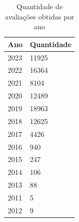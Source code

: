 \begin{table}[]
	\centering
	\begin{tabular}{|l|l|}
		\hline
		\textbf{Ano} & \textbf{Quantidade} \\\hline
		2023         & 11925               \\
		2022         & 16364               \\
		2021         & 8104                \\
		2020         & 12489               \\
		2019         & 18963               \\
		2018         & 12625               \\
		2017         & 4426                \\
		2016         & 940                 \\
		2015         & 247                 \\
		2014         & 106                 \\
		2013         & 88                  \\
		2011         & 5                   \\
		2012         & 9                   \\
		\hline
	\end{tabular}%
	\caption{Quantidade de avaliações obtidas por ano}
	\label{table:review_per_year}
\end{table}

